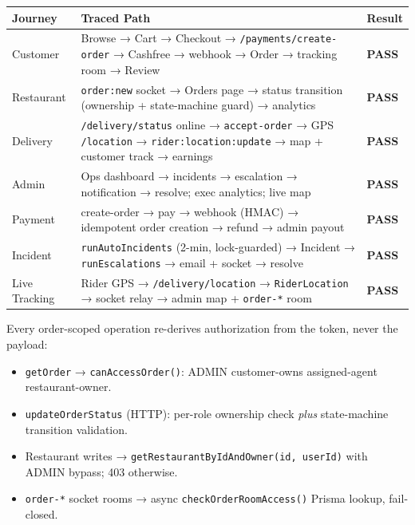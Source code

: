 \documentclass[11pt,a4paper]{article}
\newcommand{\cellok}[1]{\cellcolor{ok!15}\textbf{\color{ok}#1}}
\newcommand{\th}[1]{\textbf{\color{white}#1}}
\begin{document}
\begin{center}\footnotesize
\begin{longtable}{p{3cm}p{9.5cm}p{1.6cm}}
\toprule
\rowcolor{headbg}\th{Journey} & \th{Traced Path} & \th{Result} \\
\midrule
\endhead
Customer & Browse → Cart → Checkout → \texttt{/payments/create-order} → Cashfree → webhook → Order → tracking room → Review & \cellok{PASS} \\
\rowcolor{rowalt}Restaurant & \texttt{order:new} socket → Orders page → status transition (ownership + state-machine guard) → analytics & \cellok{PASS} \\
Delivery & \texttt{/delivery/status} online → \texttt{accept-order} → GPS \texttt{/location} → \texttt{rider:location:update} → map + customer track → earnings & \cellok{PASS} \\
\rowcolor{rowalt}Admin & Ops dashboard → incidents → escalation → notification → resolve; exec analytics; live map & \cellok{PASS} \\
Payment & create-order → pay → webhook (HMAC) → idempotent order creation → refund → admin payout & \cellok{PASS} \\
\rowcolor{rowalt}Incident & \texttt{runAutoIncidents} (2-min, lock-guarded) → Incident → \texttt{runEscalations} → email + socket → resolve & \cellok{PASS} \\
Live Tracking & Rider GPS → \texttt{/delivery/location} → \texttt{RiderLocation} → socket relay → admin map + \texttt{order-*} room & \cellok{PASS} \\
\bottomrule
\end{longtable}
\end{center}

\begin{tcolorbox}[colback=info!6,colframe=info,title=\textbf{Ownership-Gate Evidence (anti-IDOR)},breakable]
\footnotesize
Every order-scoped operation re-derives authorization from the token, never the payload:
\begin{itemize}[leftmargin=1.4em,nosep]
  \item \texttt{getOrder} → \texttt{canAccessOrder()}: ADMIN \textbar{} customer-owns \textbar{} assigned-agent \textbar{} restaurant-owner.
  \item \texttt{updateOrderStatus} (HTTP): per-role ownership check \emph{plus} state-machine transition validation.
  \item Restaurant writes → \texttt{getRestaurantByIdAndOwner(id, userId)} with ADMIN bypass; 403 otherwise.
  \item \texttt{order-*} socket rooms → async \texttt{checkOrderRoomAccess()} Prisma lookup, fail-closed.
\end{itemize}
\end{tcolorbox}
\end{document}
